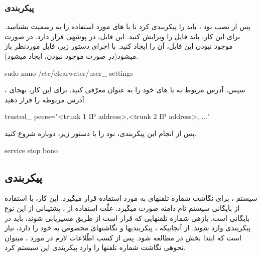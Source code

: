 \subsubsection{پیکربندی }
پس از نصب نود ، باید  را پیکربندی کرد تا  یا های مورد استفاده را به رسمیت بشناسد. برای این کار، باید فایل  را ویرایش کنید. این فایل، در پوشه\nf ی  قرار دارد. در صورت موجود نبودن این فایل، آن را ایجاد کنید. با اجرای دستور زیر، فایل موردنظر باز می\nf شود(در صورت موجود نبودن، ایجاد می\nf شود).
\begin{latin}
\noindent sudo nano /etc/clearwater/user\_ settings
\end{latin}

\noindent سپس، آدرس  مربوط به  یا های خود را به عنوان  معرّفی کنید. برای این کار، به\nf جای ، آدرس  مربوطه را قرار دهید.

\begin{latin}
\noindent trusted\_ peers="<trunk 1 IP address>,<trunk 2 IP address>, ..."
\end{latin}
\noindent پس از انجام این پیکربندی، نود  را با دستور زیر، دوباره شروع کنید.
\begin{latin}
\noindent service stop bono
\end{latin}

\nf 

\subsection{پیکربندی }
سیستم ، برای نگاشت شماره تلفن\nf های  به  مورد استفاده قرار می\nf گیرد. این کار، با استفاده از بایگانی   سیستم نام دامنه صورت می\nf گیرد. علّت استفاده از ، پشتیبانی  از این نوع بایگانی است. بازه\nf ی شماره تلفن\nf هایی که قرار است از طریق  مسیریابی شوند، باید در پیکربندی  وارد شوند. از آنجایی\nf که ، پیکربندی\nf ها و نگاشت\nf های مخصوص به خود را دارد، نیاز است که ابتدا بخش  در \cite{webenum} مطالعه شود. پس از کسب اطّلاعات لازم در مورد ، می\nf توان نحوه\nf ی نگاشت شماره تلفن\nf ها را وارد پیکربندی این سیستم کرد.


